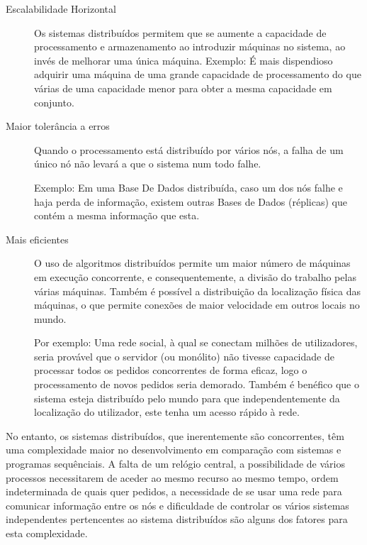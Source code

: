 \begin{description}
    \item [Escalabilidade Horizontal] Os sistemas distribuídos permitem que se aumente a capacidade de processamento e armazenamento ao introduzir máquinas no sistema, ao invés de melhorar uma única máquina.
	Exemplo: É mais dispendioso adquirir uma máquina de uma grande capacidade de processamento do que várias de uma capacidade menor para obter a mesma capacidade em conjunto.


    \item [Maior tolerância a erros]Quando o processamento está distribuído por vários nós, a falha de um único nó não levará a que o sistema num todo falhe.

	Exemplo: Em uma Base De Dados distribuída, caso um dos nós falhe e haja perda de informação, existem outras Bases de Dados (réplicas) que contém a mesma informação que esta.


    \item [Mais eficientes] O uso de algoritmos distribuídos permite um maior número de máquinas em execução concorrente, e consequentemente, a divisão do trabalho pelas várias máquinas.
	Também é possível a distribuição da localização física das máquinas, o que permite conexões de maior velocidade em outros locais no mundo.

	Por exemplo: Uma rede social, à qual se conectam milhões de utilizadores, seria provável que o servidor (ou monólito) não tivesse capacidade de processar todos os pedidos concorrentes de forma eficaz, logo o processamento de novos pedidos seria demorado. Também é benéfico que o sistema esteja distribuído pelo mundo para que independentemente da localização do utilizador, este tenha um acesso rápido à rede.



\end{description}

No entanto, os sistemas distribuídos, que inerentemente são concorrentes, têm uma complexidade maior no desenvolvimento em comparação com sistemas e programas sequênciais.
A falta de um relógio central, a possibilidade de vários processos necessitarem de aceder ao mesmo recurso ao mesmo tempo, ordem indeterminada de quais quer pedidos, a necessidade de se usar uma rede para comunicar informação entre os nós e dificuldade de controlar os vários sistemas independentes pertencentes ao sistema distribuídos são alguns dos fatores para esta complexidade.


